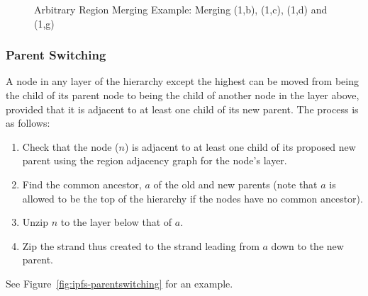 \begin{figure}[p]
\begin{center}
	\hspace{4mm}%
\end{center}
\caption{Arbitrary Region Merging Example: Merging (1,b), (1,c), (1,d) and (1,g)}
\label{fig:ipfs-arbitrarymerge}
\end{figure}

\subsubsection{Parent Switching}

A node in any layer of the hierarchy except the highest can be moved from being the child of its parent node to being the child of another node in the layer above, provided that it is adjacent to at least one child of its new parent. The process is as follows:

\begin{enumerate}
\item Check that the node ($n$) is adjacent to at least one child of its proposed new parent using the region adjacency graph for the node's layer.
\item Find the common ancestor, $a$ of the old and new parents (note that $a$ is allowed to be the top of the hierarchy if the nodes have no common ancestor).
\item Unzip $n$ to the layer below that of $a$.
\item Zip the strand thus created to the strand leading from $a$ down to the new parent.
\end{enumerate}

\noindent See Figure~\ref{fig:ipfs-parentswitching} for an example.

